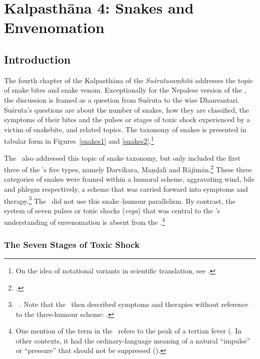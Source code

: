\chapter{Kalpasthāna 4: Snakes and Envenomation}


\section{Introduction} 

The fourth chapter of the Kalpasthāna of the \emph{Suśrutasaṃhitā}
addresses the topic of snake bites and snake venom. Exceptionally for
the Nepalese version of the \SS, the discussion is framed as a
question from Suśruta to the wise Dhanvantari.  Suśruta's questions
are about the number of snakes, how they are classified, the symptoms
of their bites and the pulses or stages of toxic shock experienced by
a victim of snakebite, and related topics.  The taxonomy of snakes is
presented in tabular form in Figures~\ref{snakes1} and
\ref{snakes2}.\footnote{On the idea of notational variants in
    scientific translation, see
    \cites{elsh-2008}{saru-2016}[81--83]{wuja-2021}.} 
    
The \CS\ also addressed this topic of snake taxonomy, but only
included the first three of the \SS's five types, namely Darvīkara,
Maṇḍalī and Rājimān.\footnote{.} These three
    categories of snakes were framed within a humoral scheme, aggravating
    wind, bile and phlegm respectively, a scheme that was carried forward
    into symptoms and therapy.\footnote{\CS\ . 
        Note that the \CS\ then described symptoms and therapies without
        reference to the three-humour scheme: .}
        The \SS\ did not use this snake--humour parallelism.  By contrast,
        the system of seven pulses or toxic shocks (\emph{vega}) that was
        central to the \SS's understanding of envenomation is absent from the
        \CS.\footnote{One mention of the term in the \CS\ refers to the peak
            of a tertian fever (. In other contexts, it had the
            ordinary-language meaning of a natural “impulse” or “pressure” that
            should not be suppressed ().}
    


\subsection{The Seven Stages of Toxic Shock}

